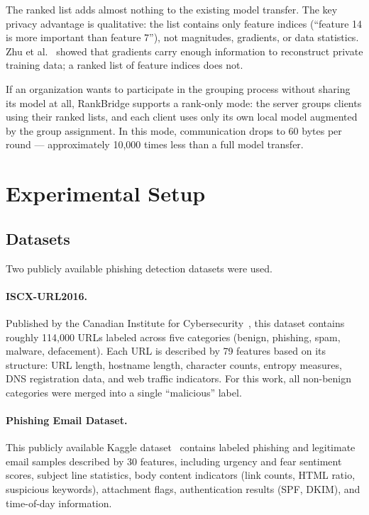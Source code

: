 \documentclass[12pt,a4paper]{article}
\begin{document}
The ranked list adds almost nothing to the existing model transfer. The key privacy advantage is qualitative: the list contains only feature indices (``feature 14 is more important than feature 7''), not magnitudes, gradients, or data statistics. Zhu et al.~\cite{zhu2019deepleakage} showed that gradients carry enough information to reconstruct private training data; a ranked list of feature indices does not.

If an organization wants to participate in the grouping process without sharing its model at all, RankBridge supports a rank-only mode: the server groups clients using their ranked lists, and each client uses only its own local model augmented by the group assignment. In this mode, communication drops to 60 bytes per round --- approximately 10{,}000 times less than a full model transfer.

\section{Experimental Setup}\label{sec:setup}

\subsection{Datasets}

Two publicly available phishing detection datasets were used.

\paragraph{ISCX-URL2016.} Published by the Canadian Institute for Cybersecurity~\cite{mamun2016detecting}, this dataset contains roughly 114{,}000 URLs labeled across five categories (benign, phishing, spam, malware, defacement). Each URL is described by 79 features based on its structure: URL length, hostname length, character counts, entropy measures, DNS registration data, and web traffic indicators. For this work, all non-benign categories were merged into a single ``malicious'' label.

\paragraph{Phishing Email Dataset.} This publicly available Kaggle dataset~\cite{subhajournal2023phishing} contains labeled phishing and legitimate email samples described by 30 features, including urgency and fear sentiment scores, subject line statistics, body content indicators (link counts, HTML ratio, suspicious keywords), attachment flags, authentication results (SPF, DKIM), and time-of-day information.
\end{document}
